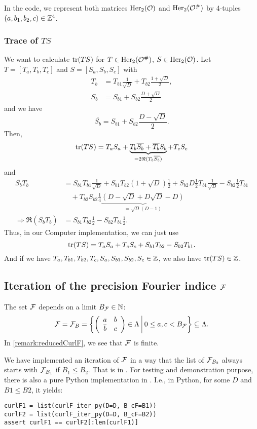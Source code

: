 In the code, we represent both matrices $\operatorname{Her}_2(\mathcal{O})$ and $\operatorname{Her}_2(\mathcal{O}^\#)$ by 4-tuples $(a,b_1,b_2,c) \in \mathbb{Z}^4$.

\subsubsection{Trace of $TS$}
\label{traceST}
We want to calculate $\textup{\textrm{tr}}(TS)$ for $T \in \operatorname{Her}_2(\mathcal{O}^\#)$, $S \in \operatorname{Her}_2(\mathcal{O})$.
Let $T = [T_a, T_b, T_c]$ and $S = [S_a, S_b, S_c]$ with
\begin{align*}
T_b &= T_{b1} \frac{1}{\sqrt{D}} + T_{b2} \frac{1 + \sqrt{D}} {2} , \\
S_b &= S_{b1} + S_{b2} \frac{D + \sqrt{D}} {2}
\end{align*}
and we have
\[ \overline{S_b} = S_{b1} + S_{b2} \frac{D - \sqrt{D}} {2} . \]
Then,
\[
\textup{\textrm{tr}}(T S) = T_a S_a
+ \underbrace{T_b \overline{S_b} + \overline{T_b} S_b}_{= 2 \Re(T_b \overline{S_b})}
+ T_c S_c
\]
and
\begin{align*}
\overline{S_b} T_b &= S_{b1} T_{b1} \tfrac{1}{\sqrt{D}} + S_{b1} T_{b2} (1 + \sqrt{D}) \tfrac{1}{2}
+ S_{b2} D \tfrac{1}{2} T_{b1} \tfrac{1}{\sqrt{D}}
- S_{b2} \tfrac{1}{2} T_{b1} \\
&\quad + T_{b2} S_{b2} \tfrac{1}{4} \underbrace{(D - \sqrt{D} + D \sqrt{D} - D)}_{=\sqrt{D}(D-1)} \\
\Rightarrow \Re(\overline{S_b} T_b) &= S_{b1} T_{b2} \tfrac{1}{2} - S_{b2} T_{b1} \tfrac{1}{2} .
\end{align*}
Thus, in our Computer implementation, we can just use
\[ \textup{\textrm{tr}}(T S) = T_a S_a + T_c S_c + S_{b1} T_{b2} - S_{b2} T_{b1} . \]
And if we have $T_a, T_{b1}, T_{b2}, T_{c}, S_a, S_{b1}, S_{b2}, S_c \in \mathbb{Z}$, we also have $\textup{\textrm{tr}}(TS) \in \mathbb{Z}$.


\subsection{Iteration of the precision Fourier indice $\mathcal{F}$}
\label{curlFiteration}

The set $\mathcal{F}$ depends on a limit $B_{\mathcal{F}} \in \mathbb{N}$:
\[ \F = \F_B = \Set{\SimpleMatrix{a}{b}{\overline b}{c} \in \Lambda}{0 \le a , c < B_{\F}} \subseteq \Lambda . \]
In \cref{remark:reducedCurlF}, we see that $\mathcal{F}$ is finite.

We have implemented an iteration of $\mathcal{F}$ in a way that the list of $\mathcal{F}_{B_2}$ always starts with $\mathcal{F}_{B_1}$ if $B_1 \le B_2$. That is  in . For testing and demonstration purpose, there is also a pure Python implementation  in . I.e., in Python, for some $D$ and $B1 \le B2$, it yields:
\begin{lstlisting}
curlF1 = list(curlF_iter_py(D=D, B_cF=B1))
curlF2 = list(curlF_iter_py(D=D, B_cF=B2))
assert curlF1 == curlF2[:len(curlF1)]
\end{lstlisting}

